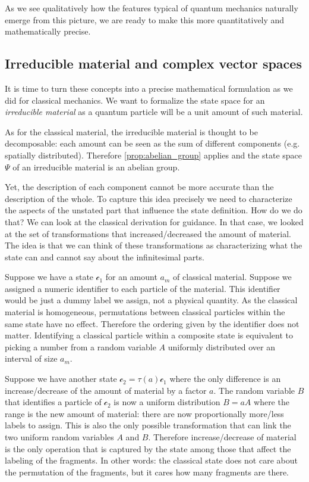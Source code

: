 \documentclass[smallextended]{svjour3}
\numberwithin{equation}{section}
\begin{document}
As we see qualitatively how the features typical of quantum mechanics naturally emerge from this picture, we are ready to make this more quantitatively and mathematically precise.

\subsection{Irreducible material and complex vector spaces}

It is time to turn these concepts into a precise mathematical formulation as we did for classical mechanics. We want to formalize the state space for an \emph{irreducible material} as a quantum particle will be a unit amount of such material.

As for the classical material, the irreducible material is thought to be decomposable: each amount can be seen as the sum of different components (e.g. spatially distributed). Therefore \ref{prop:abelian_group} applies and the state space $\Psi$ of an irreducible material is an abelian group.

Yet, the description of each component cannot be more accurate than the description of the whole. To capture this idea precisely we need to characterize the aspects of the unstated part that influence the state definition. How do we do that? We can look at the classical derivation for guidance. In that case, we looked at the set of transformations that increased/decreased the amount of material. The idea is that we can think of these transformations as characterizing what the state can and cannot say about the infinitesimal parts.

Suppose we have a state $\mathcal{c}_1$ for an amount $a_m$ of classical material. Suppose we assigned a numeric identifier to each particle of the material. This identifier would be just a dummy label we assign, not a physical quantity. As the classical material is homogeneous, permutations between classical particles within the same state have no effect. Therefore the ordering given by the identifier does not matter. Identifying a classical particle within a composite state is equivalent to picking a number from a random variable $A$ uniformly distributed over an interval of size $a_m$.

Suppose we have another state $\mathcal{c}_2 = \tau(a) \mathcal{c}_1$ where the only difference is an increase/decrease of the amount of material by a factor $a$. The random variable $B$ that identifies a particle of $\mathcal{c}_2$ is now a uniform distribution $B=aA$ where the range is the new amount of material: there are now proportionally more/less labels to assign. This is also the only possible transformation that can link the two uniform random variables $A$ and $B$. Therefore increase/decrease of material is the only operation that is captured by the state among those that affect the labeling of the fragments. In other words: the classical state does not care about the permutation of the fragments, but it cares how many fragments are there.
\end{document}
